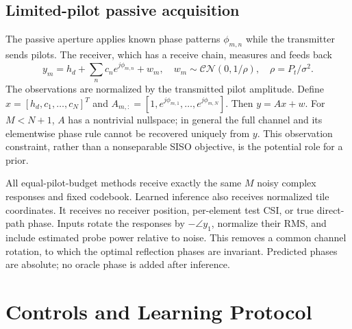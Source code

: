 \documentclass[journal]{IEEEtran}
\begin{document}
\subsection{Limited-pilot passive acquisition}
The passive aperture applies known phase patterns $\phi_{m,n}$ while the transmitter sends pilots. The receiver, which has a receive chain, measures and feeds back
\begin{equation}\label{eq:pilots}
 y_m=h_d+\sum_n c_ne^{j\phi_{m,n}}+w_m,
 \quad w_m\sim\mathcal{CN}(0,1/\rho),\quad \rho=P_t/\sigma^2.
\end{equation}
The observations are normalized by the transmitted pilot amplitude. Define $x=[h_d,c_1,\ldots,c_N]^T$ and $A_{m,:}=[1,e^{j\phi_{m,1}},\ldots,e^{j\phi_{m,N}}]$. Then $y=Ax+w$. For $M<N+1$, $A$ has a nontrivial nullspace; in general the full channel and its elementwise phase rule cannot be recovered uniquely from $y$. This observation constraint, rather than a nonseparable SISO objective, is the potential role for a prior.

All equal-pilot-budget methods receive exactly the same $M$ noisy complex responses and fixed codebook. Learned inference also receives normalized tile coordinates. It receives no receiver position, per-element test CSI, or true direct-path phase. Inputs rotate the responses by $-\angle y_1$, normalize their RMS, and include estimated probe power relative to noise. This removes a common channel rotation, to which the optimal reflection phases are invariant. Predicted phases are absolute; no oracle phase is added after inference.

\section{Controls and Learning Protocol}
\end{document}
